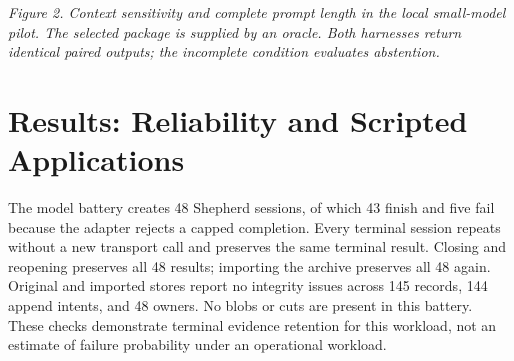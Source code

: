 \documentclass[11pt,a4paper]{article}
\begin{document}
\begin{center}

\par\small\textit{Figure 2. Context sensitivity and complete prompt length in the local small-model pilot. The selected package is supplied by an oracle. Both harnesses return identical paired outputs; the incomplete condition evaluates abstention.}\end{center}

\section{Results: Reliability and Scripted Applications}

The model battery creates 48 Shepherd sessions, of which 43 finish and five fail because the adapter rejects a capped completion. Every terminal session repeats without a new transport call and preserves the same terminal result. Closing and reopening preserves all 48 results; importing the archive preserves all 48 again. Original and imported stores report no integrity issues across 145 records, 144 append intents, and 48 owners. No blobs or cuts are present in this battery. These checks demonstrate terminal evidence retention for this workload, not an estimate of failure probability under an operational workload.
\end{document}
